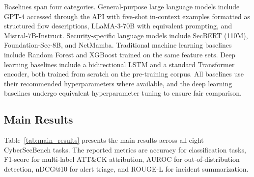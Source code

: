 \documentclass[journal]{IEEEtran}
\newcommand{\benchname}{CyberSecBench}
\begin{document}
Baselines span four categories. General-purpose large language models include GPT-4 accessed through the API with five-shot in-context examples formatted as structured flow descriptions, LLaMA-3-70B with equivalent prompting, and Mistral-7B-Instruct. Security-specific language models include SecBERT (110M), Foundation-Sec-8B, and NetMamba. Traditional machine learning baselines include Random Forest and XGBoost trained on the same feature sets. Deep learning baselines include a bidirectional LSTM and a standard Transformer encoder, both trained from scratch on the pre-training corpus. All baselines use their recommended hyperparameters where available, and the deep learning baselines undergo equivalent hyperparameter tuning to ensure fair comparison.

\subsection{Main Results}
\label{subsec:main_results}

Table~\ref{tab:main_results} presents the main results across all eight \benchname{} tasks. The reported metrics are accuracy for classification tasks, F1-score for multi-label ATT\&CK attribution, AUROC for out-of-distribution detection, nDCG@10 for alert triage, and ROUGE-L for incident summarization.
\end{document}
